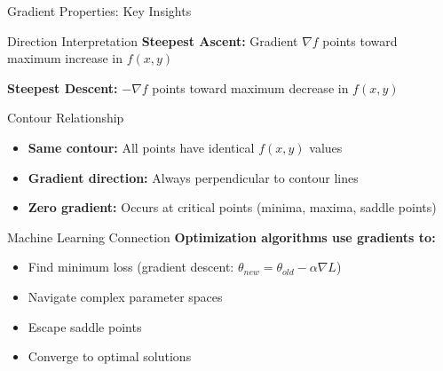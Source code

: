 \documentclass[10pt]{beamer}
\begin{document}
\begin{frame}{Gradient Properties: Key Insights}
\begin{alertbox}{Direction Interpretation}
\textbf{Steepest Ascent:} Gradient $\nabla f$ points toward maximum increase in $f(x,y)$

\textbf{Steepest Descent:} $-\nabla f$ points toward maximum decrease in $f(x,y)$
\end{alertbox}

\begin{keypointsbox}{Contour Relationship}
\begin{itemize}
\item \textbf{Same contour:} All points have identical $f(x,y)$ values
\item \textbf{Gradient direction:} Always perpendicular to contour lines
\item \textbf{Zero gradient:} Occurs at critical points (minima, maxima, saddle points)
\end{itemize}
\end{keypointsbox}

\begin{definitionbox}{Machine Learning Connection}
\textbf{Optimization algorithms use gradients to:}
\begin{itemize}
\item Find minimum loss (gradient descent: $\theta_{new} = \theta_{old} - \alpha \nabla L$)
\item Navigate complex parameter spaces
\item Escape saddle points
\item Converge to optimal solutions
\end{itemize}
\end{definitionbox}
\end{frame}
\end{document}

